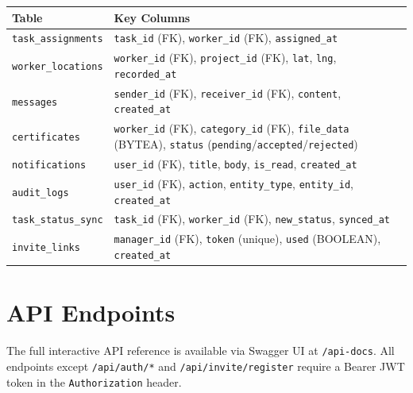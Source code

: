 \documentclass[12pt,a4paper]{article}
\begin{document}
\begin{tabularx}{\textwidth}{lX}
\toprule
\textbf{Table} & \textbf{Key Columns} \\
\midrule
\texttt{task\_assignments}  & \texttt{task\_id} (FK), \texttt{worker\_id} (FK), \texttt{assigned\_at} \\
\texttt{worker\_locations}  & \texttt{worker\_id} (FK), \texttt{project\_id} (FK), \texttt{lat}, \texttt{lng}, \texttt{recorded\_at} \\
\texttt{messages}           & \texttt{sender\_id} (FK), \texttt{receiver\_id} (FK), \texttt{content}, \texttt{created\_at} \\
\texttt{certificates}       & \texttt{worker\_id} (FK), \texttt{category\_id} (FK), \texttt{file\_data} (BYTEA), \texttt{status} (\texttt{pending}/\texttt{accepted}/\texttt{rejected}) \\
\texttt{notifications}      & \texttt{user\_id} (FK), \texttt{title}, \texttt{body}, \texttt{is\_read}, \texttt{created\_at} \\
\texttt{audit\_logs}        & \texttt{user\_id} (FK), \texttt{action}, \texttt{entity\_type}, \texttt{entity\_id}, \texttt{created\_at} \\
\texttt{task\_status\_sync} & \texttt{task\_id} (FK), \texttt{worker\_id} (FK), \texttt{new\_status}, \texttt{synced\_at} \\
\texttt{invite\_links}      & \texttt{manager\_id} (FK), \texttt{token} (unique), \texttt{used} (BOOLEAN), \texttt{created\_at} \\
\bottomrule
\end{tabularx}

\section{API Endpoints}

The full interactive API reference is available via Swagger UI at \texttt{/api-docs}. All endpoints except \texttt{/api/auth/*} and \texttt{/api/invite/register} require a Bearer JWT token in the \texttt{Authorization} header.
\end{document}

